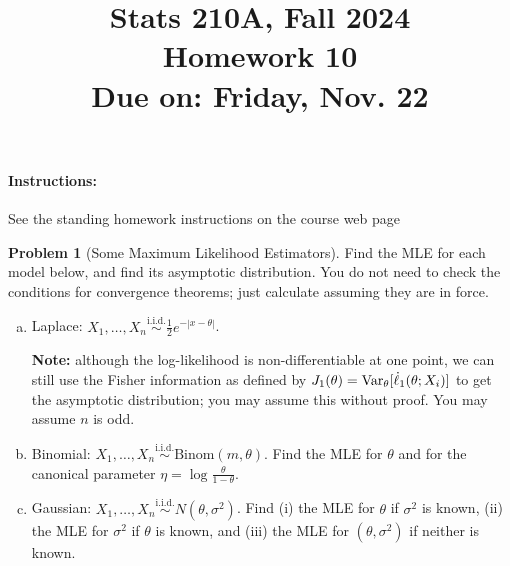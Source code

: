 \documentclass{article}
\newcommand{\Var}{\textnormal{Var}}
\newcommand{\simiid}{\overset{\text{i.i.d.}}{\sim}}
\theoremstyle{definition}
\newtheorem{problem}{Problem}
\begin{document}
\title{Stats 210A, Fall 2024\\
  Homework 10 \\
  {\large {\bf Due on}: Friday, Nov. 22}}
\date{}

\maketitle

\paragraph{Instructions:} See the standing homework instructions on the course web page


\begin{problem}[Some Maximum Likelihood Estimators]

Find the MLE for each model below, and find its asymptotic distribution. You do not need to check the conditions for convergence theorems; just calculate assuming they are in force.

\begin{enumerate}[(a)]
\item Laplace: $X_1,\ldots,X_n \simiid \frac{1}{2}e^{-|x-\theta|}$.

  {\bf Note:} although the log-likelihood is non-differentiable at one point, we can still use the Fisher information as defined by $J_1(\theta) = \Var_\theta[\dot{\ell}_1(\theta;X_i)]$ to get the asymptotic distribution; you may assume this without proof. You may assume $n$ is odd.



\item Binomial: $X_1,\ldots,X_n \simiid \text{Binom}(m,\theta)$. Find the MLE for $\theta$ and for the canonical parameter $\eta = \log\frac{\theta}{1-\theta}$.



\item Gaussian: $X_1,\ldots,X_n \simiid N(\theta,\sigma^2)$. Find (i) the MLE for $\theta$ if $\sigma^2$ is known, (ii) the MLE for $\sigma^2$ if $\theta$ is known, and (iii) the MLE for $(\theta,\sigma^2)$ if neither is known.




\end{enumerate}



\end{problem}
\end{document}
